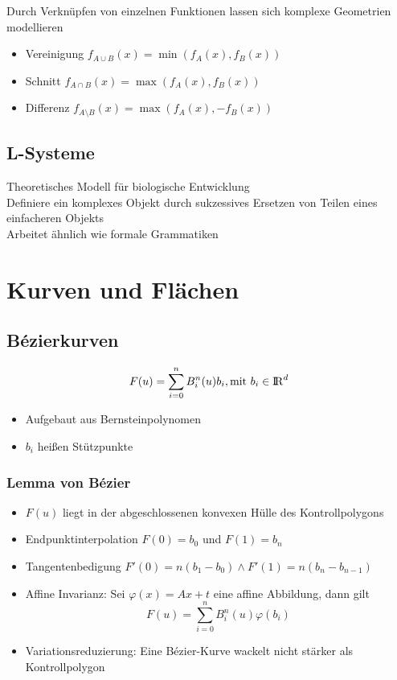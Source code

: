 \documentclass[10pt,a4paper]{article}
\def\realnumbers{{\rm I\!R}}
\begin{document}
          Durch Verknüpfen von einzelnen Funktionen lassen sich komplexe Geometrien modellieren
          \begin{itemize}
          \item Vereinigung \(f_{A \cup B} (x) = \min (f_A(x), f_B(x))\)
          \item Schnitt \(f_{A \cap B} (x) = \max (f_A(x), f_B(x))\)
          \item Differenz \(f_{A \setminus B} (x) = \max (f_A(x), - f_B(x))\)
          \end{itemize}
        
        \subsection{L-Systeme}
        Theoretisches Modell für biologische Entwicklung\\
        Definiere ein komplexes Objekt durch sukzessives Ersetzen von Teilen eines einfacheren Objekts\\
        Arbeitet ähnlich wie formale Grammatiken
        
        \newpage
        \section{Kurven und Flächen}
        
        \subsection{Bézierkurven}
        \[F(u) = \sum_{i=0}^n B_i^n(u)b_i, \text{mit } b_i \in \realnumbers^d\] 
        \begin{itemize}
        \item Aufgebaut aus Bernsteinpolynomen
        \item \(b_i\) heißen Stützpunkte
        \end{itemize}

        \subsubsection{Lemma von Bézier}
        \begin{itemize} 
        \item \(F(u)\) liegt in der abgeschlossenen konvexen Hülle des Kontrollpolygons
        \item Endpunktinterpolation \(F(0) = b_0\) und \(F(1) = b_n\)
        \item Tangentenbedigung \(F'(0) = n(b_1 - b_0) \land F'(1) = n(b_n - b_{n-1})\)
        \item Affine Invarianz: Sei \(\varphi(x) = Ax + t\) eine affine Abbildung, dann gilt
          \[F(u) = \sum^n_{i=0} B_i^n(u) \varphi(b_i)\]
        \item Variationsreduzierung: Eine Bézier-Kurve wackelt nicht stärker als Kontrollpolygon
      \end{itemize}
      
\end{document}

